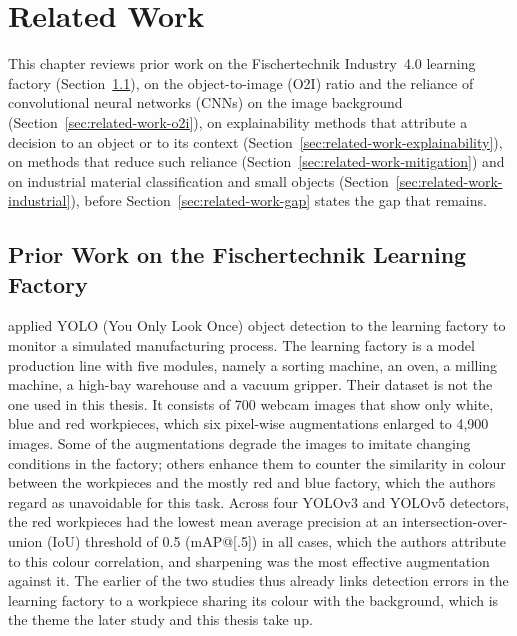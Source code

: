 \chapter{Related Work}
\label{sec:related-work}

This chapter reviews prior work on the Fischertechnik Industry~4.0 learning factory
(Section~\ref{sec:related-work-fischertechnik}), on the object-to-image (O2I) ratio and
the reliance of convolutional neural networks (CNNs) on the image background
(Section~\ref{sec:related-work-o2i}), on explainability methods that attribute a
decision to an object or to its context (Section~\ref{sec:related-work-explainability}),
on methods that reduce such reliance (Section~\ref{sec:related-work-mitigation}) and on
industrial material classification and small objects
(Section~\ref{sec:related-work-industrial}), before Section~\ref{sec:related-work-gap}
states the gap that remains.

\section{Prior Work on the Fischertechnik Learning Factory}
\label{sec:related-work-fischertechnik}

\citet{schneidereitFischertechnik2023} applied YOLO (You Only Look
Once) object detection \citep{redmon2016yolo} to the learning factory to monitor a
simulated manufacturing process. The learning factory is a model production line with
five modules, namely a sorting machine, an oven, a milling machine, a high-bay warehouse
and a vacuum gripper. Their dataset is not the one used in this thesis. It consists of
700 webcam images that show only white, blue and red workpieces, which six pixel-wise
augmentations enlarged to 4,900 images. Some of the augmentations degrade the images to
imitate changing conditions in the factory; others enhance them to counter the
similarity in colour between the workpieces and the mostly red and blue factory, which
the authors regard as unavoidable for this task. Across four YOLOv3 and YOLOv5
detectors, the red workpieces had the lowest mean average precision at an
intersection-over-union (IoU) threshold of 0.5 (mAP@[.5]) in all cases, which the
authors attribute to this colour correlation, and sharpening was the most effective
augmentation against it. The earlier
of the two studies thus already links detection errors in the learning factory to a
workpiece sharing its colour with the background, which is the theme the later study and
this thesis take up.

